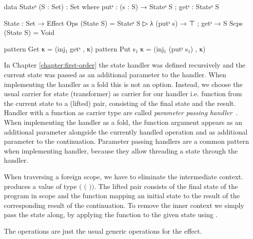 \begin{code}
data Stateˢ (S : Set) : Set where putˢ : (s : S) → Stateˢ S ; getˢ : Stateˢ S

State : Set → Effect
Ops   (State S) = Stateˢ S ▷ λ{ (putˢ s) → ⊤ ; getˢ → S }
Scps  (State S) = Void

pattern Get κ     = (inj₁ getˢ , κ)
pattern Put s₁ κ  = (inj₁ (putˢ s₁) , κ)
\end{code}
In Chapter \ref{chapter:first-order} the state handler was defined recursively
and the current state was passed as an additional parameter to the handler.
When implementing the handler as a fold this is not an option.
Instead, we choose the usual carrier for state (transformer) as carrier for our handler i.e.
function from the current state to a (lifted) pair, consisting of the final
state and the result.
Handler with a function as carrier type are called \textit{parameter passing
  handler}~\cite{DBLP:conf/esop/PlotkinP09}.
When implementing the handler as a fold, the function argument appears as an
additional parameter alongside the currently handled operation and as
additional parameter to the continuation.
Parameter passing handlers are a common pattern when implementing handler,
because they allow threading a state through the handler.

When traversing a foreign scope, we have to eliminate the intermediate context.
 produces a value of type
\AgdaSpace{}\AgdaSpace{}$($%
\AgdaSpace{}\AgdaSpace{}$($%
\AgdaSpace{}\AgdaSpace{}%
\AgdaSpace{}\AgdaSpace{}$)$$)$.
The lifted pair consists of the final state of the program in scope and the
function mapping an initial state to the result of the corresponding result of
the continuation.
To remove the inner context we simply pass the state along, by applying the
function to the given state using .

The operations are just the usual generic operations for the effect.

